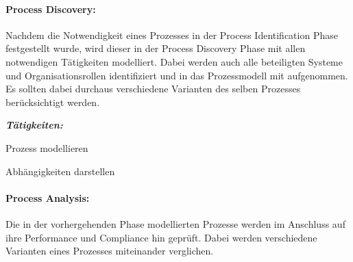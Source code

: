 %
%


\paragraph*{Process Discovery:}
Nachdem die Notwendigkeit eines Prozesses in der Process Identification Phase festgestellt wurde, wird dieser in der Process Discovery Phase mit allen notwendigen Tätigkeiten modelliert. Dabei werden auch alle beteiligten Systeme und Organisationsrollen identifiziert und in das Prozessmodell mit aufgenommen. Es sollten dabei durchaus verschiedene Varianten des selben Prozesses berücksichtigt werden.

\medskip\textit{\textbf{Tätigkeiten:}}
\begin{compactitem}{}
\item[] Prozess modellieren
\item[] Abhängigkeiten darstellen
\end{compactitem}

%

\paragraph*{Process Analysis:}
Die in der vorhergehenden Phase modellierten Prozesse werden im Anschluss auf ihre Performance und Compliance hin geprüft. Dabei werden verschiedene Varianten eines Prozesses miteinander verglichen. 

